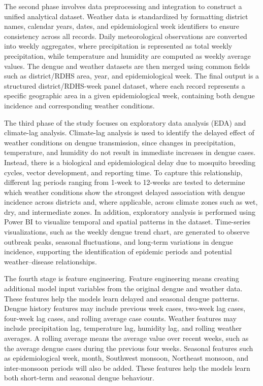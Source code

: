\documentclass[12pt,a4paper]{article}
\begin{document}
The second phase involves data preprocessing and integration to construct a unified analytical dataset. Weather data is standardized by formatting district names, calendar years, dates, and epidemiological week identifiers to ensure consistency across all records. Daily meteorological observations are converted into weekly aggregates, where precipitation is represented as total weekly precipitation, while temperature and humidity are computed as weekly average values. The dengue and weather datasets are then merged using common fields such as district/RDHS area, year, and epidemiological week. The final output is a structured district/RDHS-week panel dataset, where each record represents a specific geographic area in a given epidemiological week, containing both dengue incidence and corresponding weather conditions.

The third phase of the study focuses on exploratory data analysis (EDA) and climate-lag analysis. Climate-lag analysis is used to identify the delayed effect of weather conditions on dengue transmission, since changes in precipitation, temperature, and humidity do not result in immediate increases in dengue cases. Instead, there is a biological and epidemiological delay due to mosquito breeding cycles, vector development, and reporting time. To capture this relationship, different lag periods ranging from 1-week to 12-weeks are tested to determine which weather conditions show the strongest delayed association with dengue incidence across districts and, where applicable, across climate zones such as wet, dry, and intermediate zones. In addition, exploratory analysis is performed using Power BI to visualize temporal and spatial patterns in the dataset. Time-series visualizations, such as the weekly dengue trend chart, are generated to observe outbreak peaks, seasonal fluctuations, and long-term variations in dengue incidence, supporting the identification of epidemic periods and potential weather–disease relationships.

The fourth stage is feature engineering. Feature engineering means creating additional model input variables from the original dengue and weather data. These features help the models learn delayed and seasonal dengue patterns. Dengue history features may include previous week cases, two-week lag cases, four-week lag cases, and rolling average case counts. Weather features may include precipitation lag, temperature lag, humidity lag, and rolling weather averages. A rolling average means the average value over recent weeks, such as the average dengue cases during the previous four weeks. Seasonal features such as epidemiological week, month, Southwest monsoon, Northeast monsoon, and inter-monsoon periods will also be added. These features help the models learn both short-term and seasonal dengue behaviour.
\end{document}
